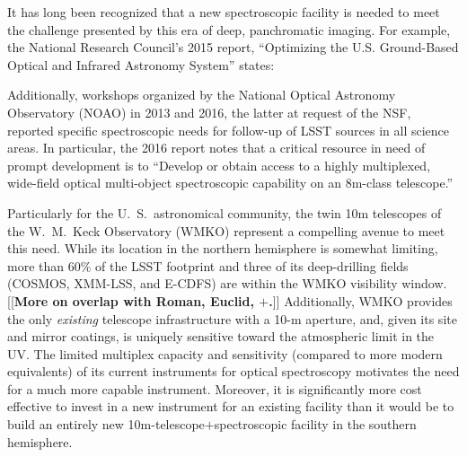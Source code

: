 \documentclass[11pt,a4paper,twoside,onecolumn,openany,final,oldfontcommands]{memoir}
\newcommand{\edit}[2][todo]{{\color{#1}[[{\bf #2}]]}}
\begin{document}
It has long been recognized that a new spectroscopic facility is needed to meet the challenge presented by this era of deep, panchromatic imaging. For example, the National Research Council's 2015 report, ``Optimizing the U.S. Ground-Based Optical and Infrared Astronomy System'' \citep{NAP21722} states:
%
\noindent{}
%
Additionally, workshops organized by the National Optical Astronomy Observatory (NOAO) in 2013 and 2016, the latter at request of the NSF, reported specific spectroscopic needs for follow-up of LSST sources in all science areas.  In particular, the 2016 report notes that a critical resource in need of prompt development is to ``Develop or obtain access to a highly multiplexed, wide-field optical multi-object spectroscopic capability on an 8m-class telescope.''

Particularly for the U.~S.\ astronomical community, the twin 10m telescopes of the W.~M.~Keck Observatory (WMKO) represent a compelling avenue to meet this need.  While its location in the northern hemisphere is somewhat limiting, more than 60\% of the LSST footprint and three of its deep-drilling fields (COSMOS, XMM-LSS, and E-CDFS) are within the WMKO visibility window.  \edit{More on overlap with Roman, Euclid, $+$.}  Additionally, WMKO provides the only {\it existing} telescope infrastructure with a 10-m aperture, and, given its site and mirror coatings, is uniquely sensitive toward the atmospheric limit in the UV.  The limited multiplex capacity and sensitivity (compared to more modern equivalents) of its current instruments for optical spectroscopy motivates the need for a much more capable instrument.  Moreover, it is significantly more cost effective to invest in a new instrument for an existing facility than it would be to build an entirely new 10m-telescope$+$spectroscopic facility in the southern hemisphere.
\end{document}
